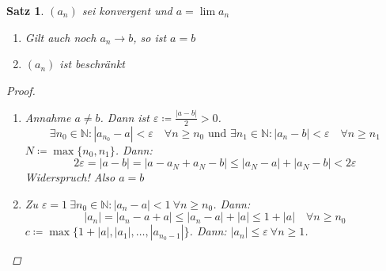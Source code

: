 \documentclass[titlepage,ngerman,a4paper,headsepline,DIV15,halfparskip*,14pt]{scrartcl}
\newcommand{\N}{\mathbb{N}}
\theoremstyle{dotless}
\newtheorem{satz}{Satz}[section]
\begin{document}
\begin{satz} \label{satz:2.1}
	$(a_{n})$ sei konvergent und $a = \lim a_{n}$
	\begin{enumerate}
		\item Gilt auch noch $a_{n} \rightarrow b$, so ist $a = b$
		\item $(a_{n})$ ist beschränkt
	\end{enumerate}
	
	\begin{proof}\
	  \begin{enumerate}
		\item Annahme $a \neq b$. Dann ist $\varepsilon \coloneqq \frac{|a - b|}{2} > 0$.
			$$
			\exists n_{0} \in \N: |a_{n_{0}} - a| < \varepsilon \quad \forall n \geq n_{0} \text{ und } \exists n_{1} \in \N: |a_n - b| < \varepsilon \quad \forall n \geq n_{1}
			$$
			$N \coloneqq \max \{ n_{0}, n_{1} \}$. Dann:
			$$
				2 \varepsilon = |a - b| = | a - a_{N} + a_{N} - b| \leq |a_{N} - a| + |a_{N} - b| < 2 \varepsilon
			$$
			Widerspruch! Also $ a = b$
		\item  Zu $\varepsilon = 1 ~\exists n_{0} \in \N: |a_{n} - a| < 1 ~\forall n \geq n_{0}$. Dann:
			$$
				|a_{n}| = |a_{n} - a + a| \leq |a_{n} - a| + |a| \leq 1 + |a| \quad \forall n \geq n_{0}
			$$
			$c \coloneqq \max \{ 1 + |a|, |a_{1}|, \dotsc, |a_{n_{0} - 1}| \}$. Dann: $|a_{n}| \leq \varepsilon ~\forall n \geq 1$.
	  \end{enumerate}
	\end{proof}	
\end{satz}
\end{document}
